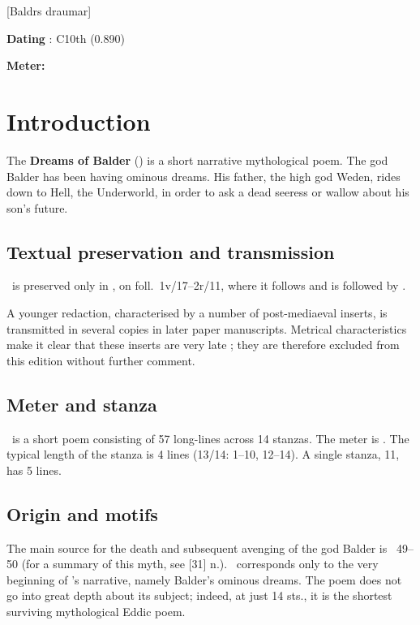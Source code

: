 [Baldrs draumar]

\begin{flushright}%
\textbf{Dating} \parencite{Sapp2022}: C10th (0.890)

\textbf{Meter:} \Fornyrdislag%
\end{flushright}

\section{Introduction}

The \textbf{Dreams of Balder} (\Baldrsdraumar) is a short narrative mythological poem.  The god Balder has been having ominous dreams.  His father, the high god Weden, rides down to Hell, the Underworld, in order to ask a dead seeress or wallow about his son’s future.

\subsection{Textual preservation and transmission}

\Baldrsdraumar\ is preserved only in \AM, on foll.~1v/17--2r/11, where it follows  and is followed by .

A younger redaction, characterised by a number of post-mediaeval inserts, is transmitted in several copies in later paper manuscripts.  Metrical characteristics make it clear that these inserts are very late \parencite{Adalsteinsson2009}; they are therefore excluded from this edition without further comment.

\subsection{Meter and stanza}

\Baldrsdraumar\ is a short poem consisting of 57 long-lines across 14 stanzas.  The meter is \Fornyrdislag.  The typical length of the stanza is 4 lines (13/14: 1--10, 12--14).  A single stanza, 11, has 5 lines.

\subsection{Origin and motifs}

The main source for the death and subsequent avenging of the god Balder is \Gylfaginning~49--50 (for a summary of this myth, see [31] n.).  \Baldrsdraumar\ corresponds only to the very beginning of \Gylfaginning’s narrative, namely Balder’s ominous dreams.  The poem does not go into great depth about its subject; indeed, at just 14 sts., it is the shortest surviving mythological Eddic poem.

